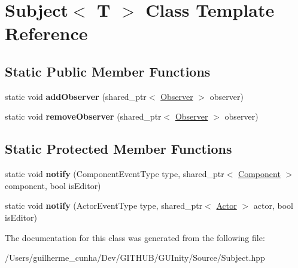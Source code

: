 \hypertarget{class_subject}{}\section{Subject$<$ T $>$ Class Template Reference}
\label{class_subject}
\subsection*{Static Public Member Functions}
\begin{DoxyCompactItemize}
\item 
\hypertarget{class_subject_acf08f1e6c3a24c7f54339b5701eca91c}{}static void {\bfseries add\+Observer} (shared\+\_\+ptr$<$ \hyperlink{class_observer}{Observer} $>$ observer)\label{class_subject_acf08f1e6c3a24c7f54339b5701eca91c}

\item 
\hypertarget{class_subject_ae19850b5b82bd0491eb1574014f567da}{}static void {\bfseries remove\+Observer} (shared\+\_\+ptr$<$ \hyperlink{class_observer}{Observer} $>$ observer)\label{class_subject_ae19850b5b82bd0491eb1574014f567da}

\end{DoxyCompactItemize}
\subsection*{Static Protected Member Functions}
\begin{DoxyCompactItemize}
\item 
\hypertarget{class_subject_ace7d9f4f390b55e8b8d00b48975764b3}{}static void {\bfseries notify} (Component\+Event\+Type type, shared\+\_\+ptr$<$ \hyperlink{class_component}{Component} $>$ component, bool is\+Editor)\label{class_subject_ace7d9f4f390b55e8b8d00b48975764b3}

\item 
\hypertarget{class_subject_aa06d86a66c1aa02f718c8a8cd76ee508}{}static void {\bfseries notify} (Actor\+Event\+Type type, shared\+\_\+ptr$<$ \hyperlink{class_actor}{Actor} $>$ actor, bool is\+Editor)\label{class_subject_aa06d86a66c1aa02f718c8a8cd76ee508}

\end{DoxyCompactItemize}


The documentation for this class was generated from the following file\+:\begin{DoxyCompactItemize}
\item 
/\+Users/guilherme\+\_\+cunha/\+Dev/\+G\+I\+T\+H\+U\+B/\+G\+U\+Inity/\+Source/Subject.\+hpp\end{DoxyCompactItemize}

